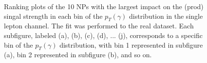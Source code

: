 \begin{figure}[ht]
  \quad
  \quad
  \quad
  \quad

  \caption{Ranking plots of the 10 NPs with the largest impact on the \tty (prod) singal strength in each bin of the $p_T(\gamma)$ distribution in the single 
  lepton channel. The fit was performed to the real dataset. Each subfigure, labeled (a), (b), (c), (d), ... (j), corresponds to a specific bin 
  of the $p_T(\gamma)$ distribution, with bin 1 represented in subfigure (a), bin 2 represented in 
  subfigure (b), and so on.}
  \label{fig:ranking_ljet_total}
\end{figure}
\FloatBarrier


